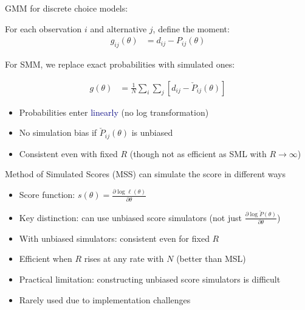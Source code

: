 \documentclass[aspectratio=169]{beamer}
\begin{document}
\begin{frame}

GMM for discrete choice models:
\bigskip\par

For each observation $i$ and alternative $j$, define the moment:
\begin{align*}
g_{ij}(\theta) &= d_{ij} - P_{ij}(\theta)
\end{align*}


\end{frame}



\begin{frame}

For SMM, we replace exact probabilities with simulated ones:


\begin{align*}
g(\theta) &= \frac{1}{N}\sum_i \sum_j \left[d_{ij} - \check{P}_{ij}(\theta)\right]
\end{align*}

\bigskip

\begin{itemize}
\itemsep1.5em
\item<3-> Probabilities enter \textcolor{navy}{linearly} (no log transformation)
\item<4-> No simulation bias if $\check{P}_{ij}(\theta)$ is unbiased
\item<5-> Consistent even with fixed $R$ (though not as efficient as SML with $R\rightarrow\infty$)
\end{itemize}

\end{frame}




\begin{frame}

Method of Simulated Scores (MSS) can simulate the score in different ways

\bigskip

\begin{itemize}
\itemsep1.5em
\item<2-> Score function: $s(\theta) = \frac{\partial \log \ell(\theta)}{\partial \theta}$
\item<3-> Key distinction: can use unbiased score simulators (not just $\frac{\partial \log \check{P}(\theta)}{\partial \theta}$)
\item<4-> With unbiased simulators: consistent even for fixed $R$
\item<5-> Efficient when $R$ rises at any rate with $N$ (better than MSL)
\item<6-> Practical limitation: constructing unbiased score simulators is difficult
\item<7-> Rarely used due to implementation challenges
\end{itemize}

\end{frame}
\end{document}
